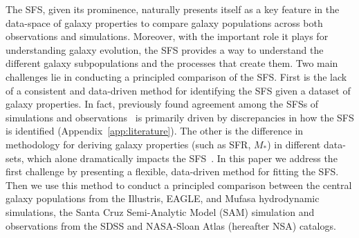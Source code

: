 \documentclass[preprint2,tighten]{aastex62}
\begin{document}
The SFS, given its prominence, naturally presents itself as a key feature 
in the data-space of galaxy properties to compare galaxy populations across 
both observations and simulations. Moreover, with the important role it plays 
for understanding galaxy evolution, the SFS provides a way to understand the 
different galaxy subpopulations and the processes that create them. Two main 
challenges lie in conducting a principled comparison of the SFS. First is the 
lack of a consistent and data-driven method for identifying the SFS given a 
dataset of galaxy properties. {\color{red} In fact, previously found agreement 
among the SFSs of simulations and observations~\citep[\emph{e.g.}][]{somerville2015b} 
is primarily driven by discrepancies in how the SFS is identified (Appendix~\ref{app:literature}).}
The other is the difference in methodology for 
deriving galaxy properties (such as SFR, $M_*$) in different data-sets, which 
alone dramatically impacts the SFS~\citep[\emph{e.g.}][]{speagle2014}. 
In this paper we address the first challenge by presenting a flexible, 
data-driven method for fitting the SFS. Then we use this method to conduct
a principled comparison between the central galaxy populations from the Illustris,
EAGLE, and {\sc Mufasa} hydrodynamic simulations, the Santa Cruz Semi-Analytic 
Model (SAM) simulation and observations from the SDSS and NASA-Sloan Atlas
(hereafter NSA) catalogs. 
\end{document}
